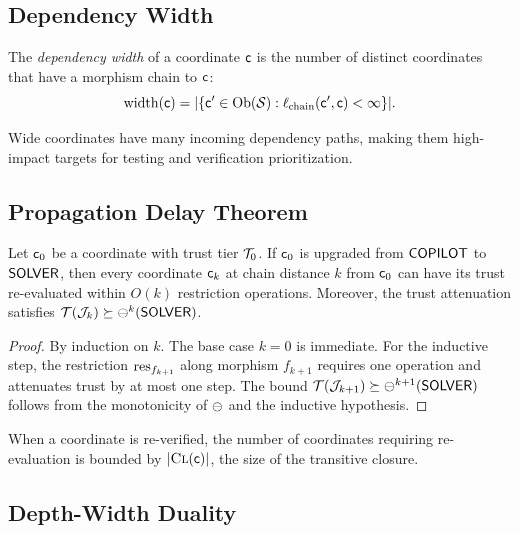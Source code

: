 \documentclass[11pt]{article}
\newcommand{\DepWidth}{\mathrm{width}}
\newcommand{\ChainLen}{\ell_{\mathrm{chain}}}
\begin{document}
\subsection{Dependency Width}

\begin{definition}\label{def:dep-width}
The \emph{dependency width} of a coordinate $\mathsf{c}$ is the number of
distinct coordinates that have a morphism chain to $\mathsf{c}$:
\[
  \DepWidth(\coord) = |\{\coord' \in \Ob(\Site) : \ChainLen(\coord', \coord) < \infty\}|.
\]
\end{definition}

Wide coordinates have many incoming dependency paths, making them
high-impact targets for testing and verification prioritization.

\subsection{Propagation Delay Theorem}

\begin{theorem}\label{thm:prop-delay}
Let $\mathsf{c}_0$ be a coordinate with trust tier $\mathcal{T}_0$.  If $\mathsf{c}_0$
is upgraded from $\mathsf{COPILOT}$ to $\mathsf{SOLVER}$, then every coordinate $\mathsf{c}_k$
at chain distance $k$ from $\mathsf{c}_0$ can have its trust re-evaluated
within $O(k)$ restriction operations.  Moreover, the trust attenuation
satisfies $\mathcal{T}(\mathcal{J}_k) \succeq \ominus^k(\mathsf{SOLVER})$.
\end{theorem}

\begin{proof}
By induction on $k$.  The base case $k = 0$ is immediate.  For the
inductive step, the restriction $\mathrm{res}_{f_{k+1}}$ along morphism $f_{k+1}$
requires one operation and attenuates trust by at most one step.  The bound
$\mathcal{T}(\mathcal{J}_{k+1}) \succeq \ominus^{k+1}(\mathsf{SOLVER})$ follows from the
monotonicity of $\ominus$ and the inductive hypothesis.
\end{proof}

\begin{corollary}\label{cor:reverify}
When a coordinate is re-verified, the number of coordinates requiring
re-evaluation is bounded by $|\textsc{Cl}(\mathsf{c})|$, the size of the
transitive closure.
\end{corollary}

\subsection{Depth-Width Duality}\label{sec:depth-width-duality}
\end{document}
